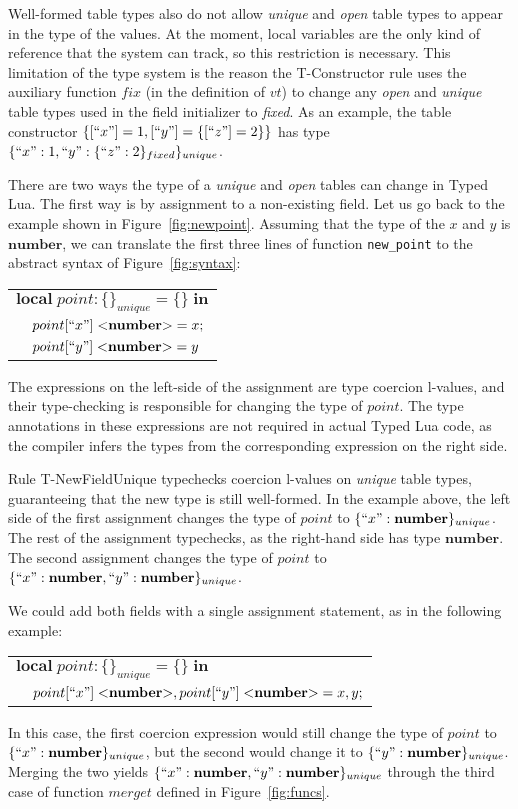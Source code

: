 \documentclass[10pt]{sigplanconf}
\newcommand{\Number}{\mathbf{number}}
\begin{document}
Well-formed table types also do not allow \emph{unique} and
\emph{open} table types to appear in the type of the values.
At the moment, local variables are the only kind of reference that the system
can track, so this restriction is
necessary. This limitation of the type system is the reason the {\sc T-Constructor} rule uses the auxiliary function $fix$
(in the definition of $vt$)
 to change any {\em open} and {\em unique} table types used in the field initializer to {\em fixed}. As an example, the table constructor $\{[``x"] = 1, [``y"] = \{[``z"] = 2\}\}$
has type $\{``x":1, ``y":\{``z":2\}_{fixed}\}_{unique}$.

There are two ways the type of a {\em unique} and {\em open} tables can change in Typed
Lua. The first way is by assignment to a non-existing
field. Let us go back to the example shown in Figure~\ref{fig:newpoint}. Assuming that the type of the
$x$ and $y$ is $\Number$, we can translate the first three lines
of function {\tt new\_point} to the abstract syntax of Figure~\ref{fig:syntax}:
{\small
\begin{center}
\begin{tabular}{ll}
\multicolumn{2}{l}{$\mathbf{local} \; point: \{\}_{unique} = \{\} \; \mathbf{in}$}\\
& \multicolumn{1}{l}{$point[``x"] \; {<}\Number{>} = x;$}\\
& \multicolumn{1}{l}{$point[``y"] \; {<}\Number{>} = y$}
\end{tabular}
\end{center}
}

The expressions on the left-side of the assignment are type
coercion l-values, and their type-checking is responsible
for changing the type of $point$. The type annotations in
these expressions are not
required in actual Typed Lua code, as the compiler infers the types from the corresponding expression on the right side.

Rule {\sc T-NewFieldUnique} typechecks coercion l-values on
{\em unique} table types, guaranteeing that the new type
is still well-formed. In the example above, the left
side of the first assignment changes the type of $point$
to $\{``x":\Number\}_{unique}$. The rest of the assignment
typechecks, as the right-hand side has type $\Number$.
The second assignment changes the type of $point$ to
$\{``x":\Number, ``y": \Number\}_{unique}$.

We could add both fields with a single assignment statement,
as in the following example:
{\small
\begin{center}
	\begin{tabular}{ll}
		\multicolumn{2}{l}{$\mathbf{local} \; point: \{\}_{unique} = \{\} \; \mathbf{in}$}\\
		& \multicolumn{1}{l}{$point[``x"] \; {<}\Number{>},point[``y"] \; {<}\Number{>} = x,y;$}
	\end{tabular}
\end{center}
}
In this case, the first coercion expression would still change the type of $point$ to $\{``x":\Number\}_{unique}$, but the
second would change it to $\{``y":\Number\}_{unique}$.
Merging the two yields $\{``x":\Number, ``y": \Number\}_{unique}$
through the third case of function $merget$ defined in Figure~\ref{fig:funcs}.
\end{document}
